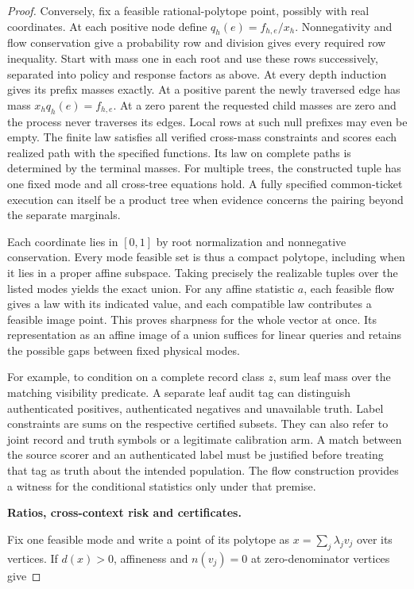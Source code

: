 \begin{proof}
Conversely, fix a feasible rational-polytope point, possibly with real coordinates. At each positive node define \(q_h(e)=f_{h,e}/x_h\). Nonnegativity and flow conservation give a probability row and division gives every required row inequality. Start with mass one in each root and use these rows successively, separated into policy and response factors as above. At every depth induction gives its prefix masses exactly. At a positive parent the newly traversed edge has mass \(x_h q_h(e)=f_{h,e}\). At a zero parent the requested child masses are zero and the process never traverses its edges. Local rows at such null prefixes may even be empty. The finite law satisfies all verified cross-mass constraints and scores each realized path with the specified functions. Its law on complete paths is determined by the terminal masses. For multiple trees, the constructed tuple has one fixed mode and all cross-tree equations hold. A fully specified common-ticket execution can itself be a product tree when evidence concerns the pairing beyond the separate marginals.

Each coordinate lies in \([0,1]\) by root normalization and nonnegative conservation. Every mode feasible set is thus a compact polytope, including when it lies in a proper affine subspace. Taking precisely the realizable tuples over the listed modes yields the exact union. For any affine statistic \(a\), each feasible flow gives a law with its indicated value, and each compatible law contributes a feasible image point. This proves sharpness for the whole vector at once. Its representation as an affine image of a union suffices for linear queries and retains the possible gaps between fixed physical modes.

For example, to condition on a complete record class \(z\), sum leaf mass over the matching visibility predicate. A separate leaf audit tag can distinguish authenticated positives, authenticated negatives and unavailable truth. Label constraints are sums on the respective certified subsets. They can also refer to joint record and truth symbols or a legitimate calibration arm. A match between the source scorer and an authenticated label must be justified before treating that tag as truth about the intended population. The flow construction provides a witness for the conditional statistics only under that premise.

\textbf{Ratios, cross-context risk and certificates.}

Fix one feasible mode and write a point of its polytope as \(x=\sum_j\lambda_j v_j\) over its vertices. If \(d(x)>0\), affineness and \(n(v_j)=0\) at zero-denominator vertices give


\end{proof}
